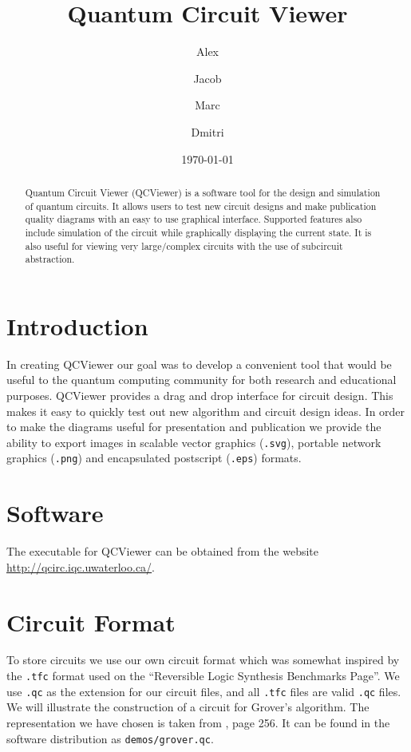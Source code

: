 \documentclass[aps,prl,reprint,floatfix,superscriptaddress]{revtex4-1} %
\begin{document}

\title{Quantum Circuit Viewer}
\date{\today}
\author{Alex }
\author{Jacob }
\author{Marc }
\author{Dmitri }
\begin{abstract}
Quantum Circuit Viewer (QCViewer) is a software tool for the design and simulation of quantum circuits.  
It allows users to test new circuit designs and make publication quality diagrams with an easy to use graphical interface.  
Supported features also include simulation of the circuit while graphically displaying the current state.
It is also useful for viewing very large/complex circuits with the use of subcircuit abstraction.
\end{abstract}
\maketitle

\section{Introduction}
In creating QCViewer our goal was to develop a convenient tool that would be useful to the quantum computing community for both research and educational purposes. 
QCViewer provides a drag and drop interface for circuit design.  
This makes it easy to quickly test out new algorithm and circuit design ideas.
In order to make the diagrams useful for presentation and publication we provide the ability to export images in scalable vector graphics (\verb+.svg+), portable network graphics (\verb+.png+) and encapsulated postscript (\verb+.eps+) formats.

\section{Software}
The executable for QCViewer can be obtained from the website \url{http://qcirc.iqc.uwaterloo.ca/}.

\section{Circuit Format}
To store circuits we use our own circuit format which was somewhat inspired by the \verb+.tfc+ format used on the ``Reversible Logic Synthesis Benchmarks Page''\cite{maslovBench}. We use \verb+.qc+ as the extension for our circuit files, and all \verb+.tfc+ files are valid \verb+.qc+ files.
We will illustrate the construction of a circuit for Grover's algorithm.  
The representation we have chosen is taken from \cite{nielsen2000quantum}, page 256.
It can be found in the software distribution as \verb+demos/grover.qc+.
\end{document}
